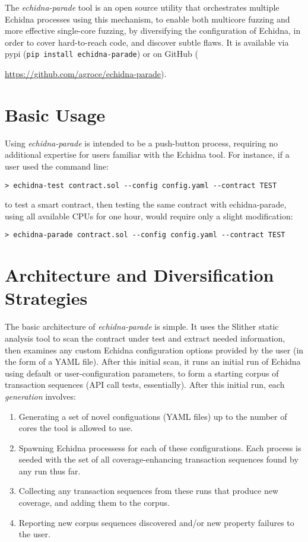 \documentclass[sigconf]{acmart}
\begin{document}
The \emph{echidna-parade} tool is an open source utility that orchestrates multiple
Echidna processes using this mechanism, to enable both multicore
fuzzing and more effective single-core fuzzing, by diversifying the
configuration of Echidna, in order to cover hard-to-reach code, and
discover subtle flaws. It is available via pypi ({\tt pip
    install echidna-parade}) or on GitHub
({\url{https://github.com/agroce/echidna-parade}).

\section{Basic Usage}

Using \emph{echidna-parade} is intended to be a push-button process,
requiring no additional expertise for users familiar with the Echidna
tool.  For instance, if a user used the command line:

{\scriptsize
\begin{verbatim}
> echidna-test contract.sol --config config.yaml --contract TEST
\end{verbatim}
  }

\noindent to test a smart contract, then testing the same contract with echidna-parade, using all
available CPUs for one hour, would require only a slight modification:

{\scriptsize
\begin{verbatim}
> echidna-parade contract.sol --config config.yaml --contract TEST
\end{verbatim}
  }

\section{Architecture and Diversification Strategies}

The basic architecture of \emph{echidna-parade} is simple.  It uses
the Slither static analysis tool to scan the contract under test and
extract needed information, then examines any custom Echidna
configuration options provided by the user (in the form of a YAML
file).  After this initial scan, it runs an initial run of Echidna
using default or user-configuration parameters, to form a starting
corpus of transaction sequences (API call tests, essentially).  After
this initial run, each \emph{generation} involves:

\begin{enumerate}
  \item Generating a set of novel configuations (YAML files) up to the
    number of cores the tool is allowed to use. 
    \item Spawning Echidna processess for each of these
      configurations.  Each process is seeded with the set of all
      coverage-enhancing transaction sequences found by any run thus far.
      \item Collecting any transaction sequences from these runs that
        produce new coverage, and adding them to the corpus.
        \item Reporting new corpus sequences discovered and/or new property failures to
          the user.
        \end{enumerate}

}
\end{document}
